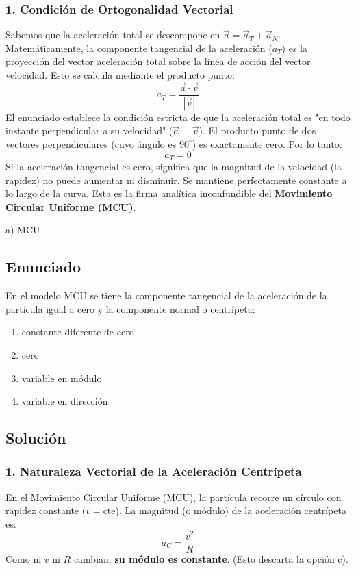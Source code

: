 \documentclass[12pt, a4paper]{article}
\begin{document}
\subsubsection*{1. Condición de Ortogonalidad Vectorial}
Sabemos que la aceleración total se descompone en $\vec{a} = \vec{a}_T + \vec{a}_N$.
Matemáticamente, la componente tangencial de la aceleración ($a_T$) es la proyección del vector aceleración total sobre la línea de acción del vector velocidad. Esto se calcula mediante el producto punto:
$$ a_T = \frac{\vec{a} \cdot \vec{v}}{|\vec{v}|} $$
El enunciado establece la condición estricta de que la aceleración total es "en todo instante perpendicular a su velocidad" ($\vec{a} \perp \vec{v}$). 
El producto punto de dos vectores perpendiculares (cuyo ángulo es $90^\circ$) es exactamente cero. Por lo tanto:
$$ a_T = 0 $$
Si la aceleración tangencial es cero, significa que la magnitud de la velocidad (la rapidez) no puede aumentar ni disminuir. Se mantiene perfectamente constante a lo largo de la curva. Esta es la firma analítica inconfundible del \textbf{Movimiento Circular Uniforme (MCU)}.

\begin{tcolorbox}[colback=green!5!white, colframe=green!50!black, title=Respuesta Final]
\centering \Large a) MCU
\end{tcolorbox}

\newpage

\subsection*{Enunciado}
En el modelo MCU se tiene la componente tangencial de la aceleración de la partícula igual a cero y la componente normal o centrípeta:
\begin{enumerate}[label=\alph*)]
    \item constante diferente de cero
    \item cero
    \item variable en módulo
    \item variable en dirección
\end{enumerate}

\subsection*{Solución}

\subsubsection*{1. Naturaleza Vectorial de la Aceleración Centrípeta}
En el Movimiento Circular Uniforme (MCU), la partícula recorre un círculo con rapidez constante ($v = \text{cte}$).
La magnitud (o módulo) de la aceleración centrípeta es:
$$ a_C = \frac{v^2}{R} $$
Como ni $v$ ni $R$ cambian, \textbf{su módulo es constante}. (Esto descarta la opción c).
\end{document}
